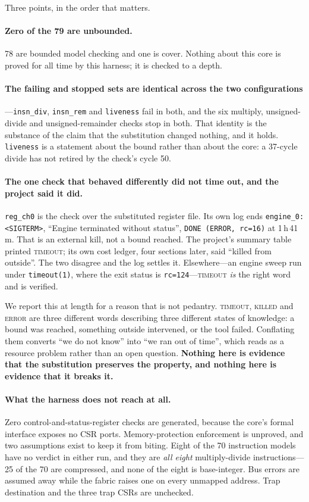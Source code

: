 \documentclass[11pt,a4paper]{article}
\begin{document}
Three points, in the order that matters.

\paragraph{Zero of the 79 are unbounded.}
78 are bounded model checking and one is cover. Nothing about this core
is proved for all time by this harness; it is checked to a depth.

\paragraph{The failing and stopped sets are identical across the two
configurations}---\texttt{insn\_div}, \texttt{insn\_rem} and
\texttt{liveness} fail in both, and the six multiply, unsigned-divide and
unsigned-remainder checks stop in both. That identity is the substance of
the claim that the substitution changed nothing, and it holds.
\texttt{liveness} is a statement about the bound rather than about the
core: a 37-cycle divide has not retired by the check's cycle 50.

\paragraph{The one check that behaved differently did not time out, and
the project said it did.}
\texttt{reg\_ch0} is the check over the substituted register file. Its
own log ends \texttt{engine\_0: <SIGTERM>}, ``Engine terminated without
status'', \texttt{DONE (ERROR, rc=16)} at 1\,h\,41\,m. That is an
external kill, not a bound reached. The project's summary table printed
\textsc{timeout}; its own cost ledger, four sections later, said ``killed
from outside''. The two disagree and the log settles it. Elsewhere---an
engine sweep run under \texttt{timeout(1)}, where the exit status is
\texttt{rc=124}---\textsc{timeout} \emph{is} the right word and is
verified.

We report this at length for a reason that is not pedantry.
\textsc{timeout}, \textsc{killed} and \textsc{error} are three different
words describing three different states of knowledge: a bound was
reached, something outside intervened, or the tool failed. Conflating
them converts ``we do not know'' into ``we ran out of time'', which reads
as a resource problem rather than an open question. \textbf{Nothing here
is evidence that the substitution preserves the property, and nothing
here is evidence that it breaks it.}

\paragraph{What the harness does not reach at all.}
Zero control-and-status-register checks are generated, because the core's
formal interface exposes no CSR ports. Memory-protection enforcement is
unproved, and two assumptions exist to keep it from biting. Eight of the
70 instruction models have no verdict in either run, and they are
\emph{all eight} multiply-divide instructions---25 of the 70 are
compressed, and none of the eight is base-integer. Bus errors are
assumed away while the fabric raises one on every unmapped address. Trap
destination and the three trap CSRs are unchecked.
\end{document}
